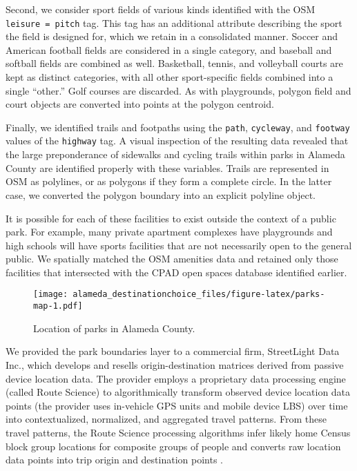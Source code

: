 \documentclass[]{elsarticle} %
\makeatletter
\def\maxwidth{\ifdim\Gin@nat@width>\linewidth\linewidth
\else\Gin@nat@width\fi}
\let\Oldincludegraphics\includegraphics
\renewcommand{\includegraphics}[1]{\Oldincludegraphics[width=\maxwidth]{#1}}
\makeatother
\begin{document}
Second, we consider sport fields of various kinds identified with the OSM
\texttt{leisure\ =\ pitch} tag. This tag has an additional attribute describing the sport
the field is designed for, which we retain in a consolidated manner. Soccer and
American football fields are considered in a single category, and baseball and
softball fields are combined as well. Basketball, tennis, and volleyball courts
are kept as distinct categories, with all other sport-specific fields combined
into a single ``other.'' Golf courses are discarded. As with playgrounds, polygon
field and court objects are converted into points at the polygon centroid.

Finally, we identified trails and footpaths using the \texttt{path}, \texttt{cycleway}, and
\texttt{footway} values of the \texttt{highway} tag. A visual inspection of the resulting data
revealed that the large preponderance of sidewalks and cycling trails within parks
in Alameda County are identified properly with these variables. Trails are
represented in OSM as polylines, or as polygons if they form a complete circle.
In the latter case, we converted the polygon boundary into an explicit polyline object.

It is possible for each of these facilities to exist outside the context of
a public park. For example, many private apartment complexes have playgrounds
and high schools will have sports facilities that are not necessarily open to
the general public. We spatially matched the OSM amenities data and retained
only those facilities that intersected with the CPAD open spaces database
identified earlier.

\begin{figure}
\centering
\texttt{[image: alameda\_destinationchoice\_files/figure-latex/parks-map-1.pdf]}
\caption{\label{fig:parks-map}Location of parks in Alameda County.}
\end{figure}

We provided the park boundaries layer to a commercial firm, StreetLight Data
Inc., which develops and resells origin-destination matrices derived from
passive device location data. The provider employs a proprietary data processing
engine (called Route Science) to algorithmically transform observed device
location data points (the provider uses in-vehicle GPS units and mobile device
LBS) over time into contextualized, normalized, and aggregated travel patterns.
From these travel patterns, the Route Science processing algorithms infer likely
home Census block group locations for composite groups of people and converts
raw location data points into trip origin and destination points \citep{Pan2006, Friedrich2010}.
\end{document}
